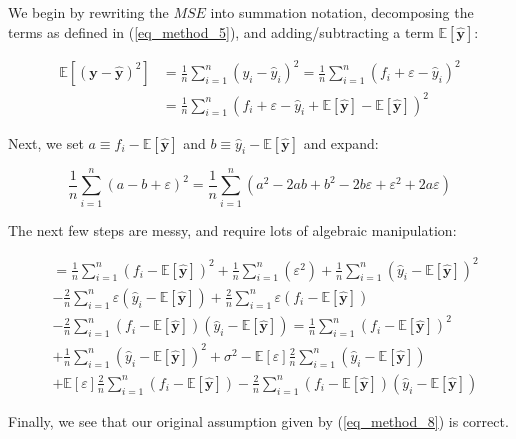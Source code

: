 \documentclass[a4paper,10pt,english]{article}
\begin{document}
We begin by rewriting the $MSE$ into summation notation, decomposing the terms as defined in (\ref{eq_method_5}), and adding/subtracting a term $\mathbb{E}[\hat{\mathbf{y}}]$:

\begin{align*}
\mathbb{E}\left[(\mathbf{y}-\hat{\mathbf{y}})^{2}\right] &= \frac{1}{n} \sum_{i=1}^{n} ( y_i - \hat{y}_i )^2 = \frac{1}{n} \sum_{i=1}^{n} ( f_i + \varepsilon - \hat{y}_i )^2 \\
&= \frac{1}{n} \sum_{i=1}^{n} ( f_i + \varepsilon - \hat{y}_i  + \mathbb{E}[\hat{\mathbf{y}}] - \mathbb{E}[\hat{\mathbf{y}}] )^2
\end{align*}

Next, we set $a \equiv f_i - \mathbb{E}[\hat{\mathbf{y}}] $ and $b \equiv \hat{y}_i - \mathbb{E}[\hat{\mathbf{y}}]$ and expand:

\begin{equation*}
\frac{1}{n} \sum_{i=1}^{n} (a - b + \varepsilon )^2
= \frac{1}{n} \sum_{i=1}^{n} ( a^2 - 2ab + b^2 - 2b\varepsilon + \varepsilon^2 + 2a\varepsilon )
\end{equation*}

The next few steps are messy, and require lots of algebraic manipulation:	

\begin{align*}	
&= \frac{1}{n} \sum_{i=1}^{n} ( f_i - \mathbb{E}[\hat{\mathbf{y}}] )^2 
+ \frac{1}{n} \sum_{i=1}^{n} ( \varepsilon^2 )
+ \frac{1}{n} \sum_{i=1}^{n} ( \hat{y}_i - \mathbb{E}[\hat{\mathbf{y}}] )^2 
\\&- \frac{2}{n} \sum_{i=1}^{n} \varepsilon ( \hat{y}_i - \mathbb{E}[\hat{\mathbf{y}}] )
+ \frac{2}{n} \sum_{i=1}^{n} \varepsilon ( f_i - \mathbb{E}[\hat{\mathbf{y}}] )
\\&- \frac{2}{n} \sum_{i=1}^{n} ( f_i - \mathbb{E}[\hat{\mathbf{y}}] ) ( \hat{y}_i - \mathbb{E}[\hat{\mathbf{y}}] )
= \frac{1}{n} \sum_{i=1}^{n} ( f_i - \mathbb{E}[\hat{\mathbf{y}}] )^2 
\\&+ \frac{1}{n} \sum_{i=1}^{n} ( \hat{y}_i - \mathbb{E}[\hat{\mathbf{y}}] )^2 
+ \sigma^2
- \mathbb{E}[\varepsilon] \frac{2}{n} \sum_{i=1}^{n} ( \hat{y}_i - \mathbb{E}[\hat{\mathbf{y}}] )
\\&+ \mathbb{E}[\varepsilon] \frac{2}{n} \sum_{i=1}^{n} ( f_i - \mathbb{E}[\hat{\mathbf{y}}] )
-\frac{2}{n} \sum_{i=1}^{n} ( f_i - \mathbb{E}[\hat{\mathbf{y}}] ) ( \hat{y}_i - \mathbb{E}[\hat{\mathbf{y}}] )
\end{align*}

Finally, we see that our original assumption given by (\ref{eq_method_8}) is correct.
\end{document}

